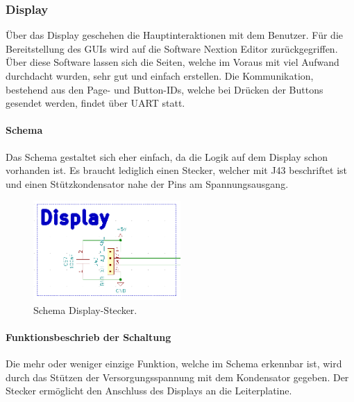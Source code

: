 \subsubsection{Display}
\label{subsubsec:Display}

Über das Display geschehen die Hauptinteraktionen mit dem Benutzer. Für die Bereitstellung des GUIs wird auf die Software Nextion Editor zurückgegriffen. Über diese Software lassen sich die Seiten, welche im Voraus mit viel Aufwand durchdacht wurden, sehr gut und einfach erstellen. Die Kommunikation, bestehend aus den Page- und Button-IDs, welche bei Drücken der Buttons gesendet werden, findet über UART statt.

\paragraph{Schema}\mbox{}

Das Schema gestaltet sich eher einfach, da die Logik auf dem Display schon vorhanden ist. Es braucht lediglich einen Stecker, welcher mit J43 beschriftet ist und einen Stützkondensator nahe der Pins am Spannungsausgang.

\begin{figure}[h!]
	\centering
	\includegraphics[width=0.5\textwidth]{graphics/Schema_Display}
	\caption{Schema Display-Stecker.}
	\label{fig:Schema_Display}
\end{figure}

\paragraph{Funktionsbeschrieb der Schaltung}\mbox{}

Die mehr oder weniger einzige Funktion, welche im Schema erkennbar ist, wird durch das Stützen der Versorgungsspannung mit dem Kondensator gegeben. Der Stecker ermöglicht den Anschluss des Displays an die Leiterplatine.